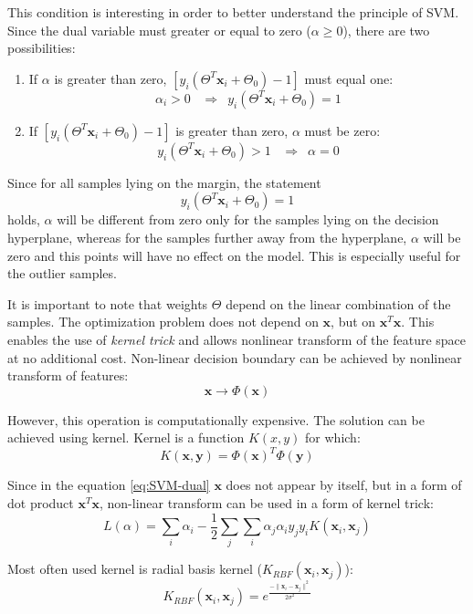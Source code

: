 \documentclass{article}
\begin{document}
This condition is interesting in order to better understand the principle of SVM. Since the dual variable must greater or equal to zero ($\alpha \geq 0$), there are two possibilities:
\begin{enumerate}
\item
If $\alpha$ is greater than zero, $\left[ y_i \left( \Theta^T\mathbf{x}_i + \Theta_0  \right) -1 \right]$ must equal one:
\begin{equation} 
\alpha_i > 0 \,\,\,\,\, \Rightarrow \,\,\,  y_i \left( \Theta^T\mathbf{x}_i + \Theta_0  \right) = 1
\end{equation}
\item
If $\left[ y_i \left( \Theta^T\mathbf{x}_i + \Theta_0  \right) -1 \right]$ is greater than zero, $\alpha$ must be zero:
\begin{equation} 
y_i \left( \Theta^T\mathbf{x}_i + \Theta_0  \right) > 1 \,\,\,\,\, \Rightarrow \,\,\,  \alpha = 0
\end{equation}
\end{enumerate}

Since for all samples lying on the margin, the statement  
\begin{equation}
y_i \left( \Theta^T\mathbf{x}_i + \Theta_0  \right) = 1
\end{equation}
\noindent holds, $\alpha$ will be different from zero only for the samples lying on the decision hyperplane, whereas for the samples further away from the hyperplane, $\alpha$ will be zero and this points will have no effect on the model. This is especially useful for the outlier samples.


It is important to note that weights $\Theta$ depend on the linear combination of the samples. The optimization problem does not depend on $\mathbf{x}$, but on $\mathbf{x}^T\mathbf{x}$. This enables the use of \emph{kernel trick} and allows nonlinear transform of the feature space at no additional cost. Non-linear decision boundary can be achieved by nonlinear transform of features:
\begin{equation} 
\mathbf{x} \rightarrow \Phi(\mathbf{x})
\end{equation}

However, this operation is computationally expensive. The solution can be achieved using kernel. Kernel is a function $K(x,y)$ for which:
\begin{equation} 
K(\mathbf{x},\mathbf{y}) = \Phi(\mathbf{x})^T  \Phi(\mathbf{y})
\end{equation}

Since in the equation \ref{eq:SVM-dual} $\mathbf{x}$ does not appear by itself, but in a form of dot product $\mathbf{x}^T\mathbf{x}$, non-linear transform can be used in a form of kernel trick:
\begin{equation} 
L(\alpha) = \sum_i \alpha_i - \frac{1}{2} \sum_j \sum_i \alpha_j \alpha_i y_j y_i K(\mathbf{x}_i, \mathbf{x}_j)
\end{equation}

Most often used kernel is radial basis kernel ($K_{RBF}(\mathbf{x}_i,\mathbf{x}_j)$):
\begin{equation} 
K_{RBF}(\mathbf{x}_i,\mathbf{x}_j) = e^\frac{-\parallel \mathbf{x}_i - \mathbf{x}_j\parallel^2}{2\sigma^2}
\end{equation}
\end{document}
